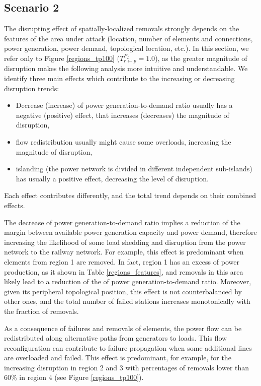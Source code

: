 \documentclass[review]{elsarticle}
\begin{document}
\subsection{Scenario 2}
	
	The disrupting effect of spatially-localized removals strongly depends on the features of the area under attack (location, number of elements and connections, power generation, power demand, topological location, etc.). In this section, we refer only to Figure \ref{regions_tp100} ($T_{r \leftarrow p}^{P_L}=1.0$), as the greater magnitude of disruption makes the following analysis more intuitive and understandable. We identify three main effects which contribute to the increasing or decreasing disruption trends:
	\begin{itemize}
	    \item Decrease (increase) of power generation-to-demand ratio usually has a negative (positive) effect, that increases (decreases) the magnitude of disruption,
	    \item flow redistribution usually might cause some overloads, increasing the magnitude of disruption,
	    \item islanding (the power network is divided in different independent sub-islands) has usually a positive effect, decreasing the level of disruption.
	\end{itemize}
	Each effect contributes differently, and the total trend depends on their combined effects.
	
	The decrease of power generation-to-demand ratio implies a reduction of the margin between available power generation capacity and power demand, therefore increasing the likelihood of some load shedding and disruption from the power network to the railway network. For example, this effect is predominant when elements from region 1 are removed. In fact, region 1 has an excess of power production, as it shown in Table \ref{regions_features}, and removals in this area likely lead to a reduction of the of power generation-to-demand ratio. Moreover, given its peripheral topological position, this effect is not counterbalanced by other ones, and the total number of failed stations increases monotonically with the fraction of removals.
	
	As a consequence of failures and removals of elements, the power flow can be redistributed along alternative paths from generators to loads. This flow reconfiguration can contribute to failure propagation when some additional lines are overloaded and failed. This effect is predominant, for example, for the increasing disruption in region 2 and 3 with percentages of removals lower than 60\% in region 4 (see Figure \ref{regions_tp100}).
	
\end{document}
